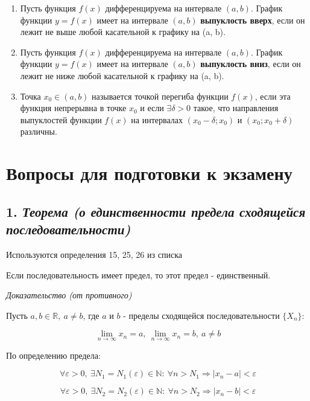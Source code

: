 \begin{enumerate}
\item Пусть функция $f(x)$ дифференцируема на интервале $(a, b)$. График функции $y = f(x)$ имеет на интервале $(a, b)$ \textbf{выпуклость вверх}, если он лежит не выше любой касательной к графику на (a, b).
\item Пусть функция $f(x)$ дифференцируема на интервале $(a, b)$. График функции $y = f(x)$ имеет на интервале $(a, b)$ \textbf{выпуклость вниз}, если он лежит не ниже любой касательной к графику на (a, b).
\item Точка $x_0 \in (a,b)$ называется точкой перегиба функции $f(x)$, если эта функция непрерывна в точке $x_0$ и если $\exists \delta > 0$ такое, что направления выпуклостей функции $f(x)$ на интервалах $(x_0-\delta; x_0)$ и $(x_0; x_0+\delta)$ различны.

\end{enumerate}
\newpage 
\section*{Вопросы для подготовки к экзамену}
\subsection*{1. \textit{Теорема (о единственности предела сходящейся последовательности)}}
\begin{Quote2} 
\small\centering 

Используются определения 15, 25, 26 из списка \end{Quote2} 

Если последовательность имеет предел, то этот предел - единственный.
\vspace*{20pt} 

\textit{Доказательство (от противного)}

Пусть $a, b \in \mathbb{R}, \ a \neq b$, где $a$ и $b$ - пределы сходящейся последовательности $\{X_n\}$:

$$
\lim\limits_{n \to \infty} x_n = a,\ \lim\limits_{n \to \infty} x_n = b, \ a \neq b
$$

По определению предела:

$$
\forall {\varepsilon} > 0, \ \exists N_1 = N_1({\varepsilon}) \in \mathbb{N} : \ \forall n > N_1 \Rightarrow  | x_n - a|  < {\varepsilon} 
$$

$$
\forall {\varepsilon} > 0, \ \exists N_2 = N_2({\varepsilon}) \in \mathbb{N} : \ \forall n > N_2 \Rightarrow  | x_n - b|  < {\varepsilon} 
$$


